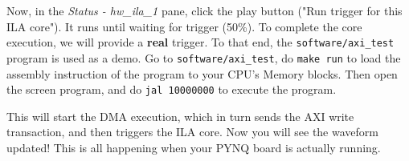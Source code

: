 \documentclass[11pt]{article}
\begin{document}
\begin{appendices}
\begin{center}
\end{center}

Now, in the \emph{Status - hw\_ila\_1} pane, click the play button ("Run trigger for this ILA core"). It runs until waiting for trigger (50\%). To complete the core execution, we will provide a \textbf{real} trigger. To that end, the \verb|software/axi_test| program is used as a demo. Go to \verb|software/axi_test|, do \texttt{make run} to load the assembly instruction of the program to your CPU's Memory blocks. Then open the screen program, and do \texttt{jal 10000000} to execute the program.

\begin{center}
\end{center}

This will start the DMA execution, which in turn sends the AXI write transaction, and then triggers the ILA core. Now you will see the waveform updated! This is all happening when your PYNQ board is actually running.


\end{appendices}
\end{document}
